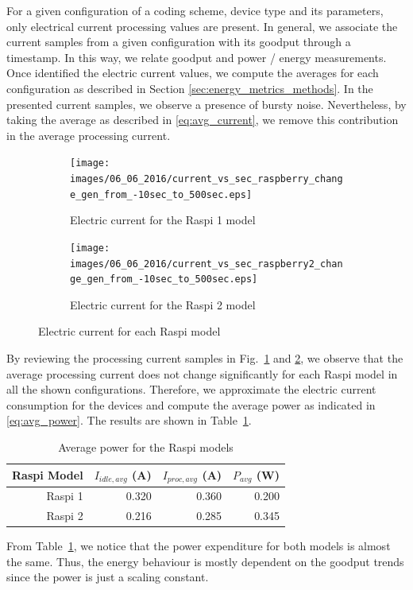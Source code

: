 For a given configuration of a coding scheme, device type and its parameters,
only electrical current processing values are present. In general, we
associate the current samples from a given configuration with its goodput
through a timestamp. In this way, we relate goodput and power / energy
measurements. Once identified the electric current values, we compute the
averages for each configuration as described in Section
\ref{sec:energy_metrics_methods}. In the presented current samples, we observe
a presence of bursty noise. Nevertheless, by taking the average as described
in \eqref{eq:avg_current}, we remove this contribution in the average
processing current.
%
\begin{figure}
    \centering
    \begin{subfigure}[b]{0.475\textwidth}
        \centering
        \texttt{[image: images/06\_06\_2016/current\_vs\_sec\_raspberry\_change\_gen\_from\_-10sec\_to\_500sec.eps]}
        \caption[]%
        {{\small Electric current for the \ac{Raspi} 1 model}}
        \label{fig:current_rasp1}
    \end{subfigure}
    \hfill
    \begin{subfigure}[b]{0.475\textwidth}
        \centering
        \texttt{[image: images/06\_06\_2016/current\_vs\_sec\_raspberry2\_change\_gen\_from\_-10sec\_to\_500sec.eps]}
        \caption[]%
        {{\small Electric current for the \ac{Raspi} 2 model}}
        \label{fig:current_rasp2}
    \end{subfigure}

    \caption[]
    {\small Electric current for each \ac{Raspi} model}
    \label{fig:current_rasp}
\end{figure}
%
By reviewing the processing current samples in Fig.~\ref{fig:current_rasp1}
and \ref{fig:current_rasp2}, we observe that the average processing current
does not change significantly for each \ac{Raspi} model in all the shown
configurations. Therefore, we approximate the electric current consumption
for the devices and compute the average power as indicated in
\eqref{eq:avg_power}. The results are shown in
Table~\ref{tab:average_power_table}.

\begin{table}[H]
\center
\caption{Average power for the \ac{Raspi} models}
\begin{tabular}{|r|r|r|r|}

\hline
\ac{Raspi} Model & $I_{idle,avg}$ (A)& $I_{proc,avg}$ (A) & $P_{avg}$ (W) \\
\hline
\hline
    \ac{Raspi} 1 &      0.320        &            0.360    & 0.200\\
\hline
    \ac{Raspi} 2 &      0.216        &            0.285    & 0.345\\
\hline
\end{tabular}
\vspace{0.2cm}
\label{tab:average_power_table}
\end{table}
%
From Table~\ref{tab:average_power_table}, we notice that the power expenditure
for both models is almost the same. Thus, the energy behaviour is mostly
dependent on the goodput trends since the power is just a scaling constant.
%
